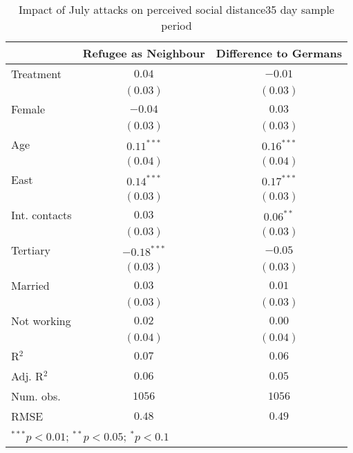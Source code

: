
\begin{table}
\caption{Impact of July attacks on perceived social distance35 day sample period}
\begin{center}
\begin{tabular}{l c c}
\toprule
 & Refugee as Neighbour & Difference to Germans \\
\midrule
Treatment     & $0.04$        & $-0.01$      \\
              & $(0.03)$      & $(0.03)$     \\
Female        & $-0.04$       & $0.03$       \\
              & $(0.03)$      & $(0.03)$     \\
Age           & $0.11^{***}$  & $0.16^{***}$ \\
              & $(0.04)$      & $(0.04)$     \\
East          & $0.14^{***}$  & $0.17^{***}$ \\
              & $(0.03)$      & $(0.03)$     \\
Int. contacts & $0.03$        & $0.06^{**}$  \\
              & $(0.03)$      & $(0.03)$     \\
Tertiary      & $-0.18^{***}$ & $-0.05$      \\
              & $(0.03)$      & $(0.03)$     \\
Married       & $0.03$        & $0.01$       \\
              & $(0.03)$      & $(0.03)$     \\
Not working   & $0.02$        & $0.00$       \\
              & $(0.04)$      & $(0.04)$     \\
\midrule
R$^2$         & $0.07$        & $0.06$       \\
Adj. R$^2$    & $0.06$        & $0.05$       \\
Num. obs.     & $1056$        & $1056$       \\
RMSE          & $0.48$        & $0.49$       \\
\bottomrule
\multicolumn{3}{l}{\scriptsize{$^{***}p<0.01$; $^{**}p<0.05$; $^{*}p<0.1$}}
\end{tabular}
\label{tab_dist_35}
\end{center}
\end{table}
